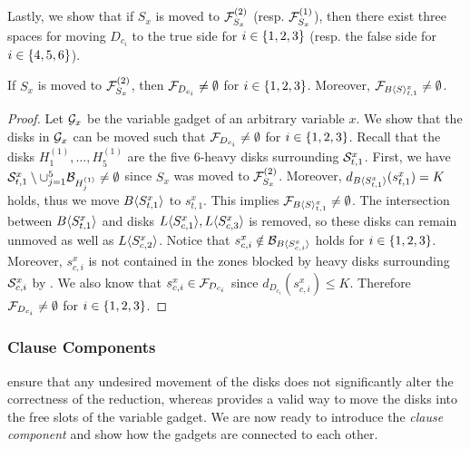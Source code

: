 \begin{toappendix}
\begin{toappendix}
Lastly, we show that if $S_x$ is moved to $\F_{S_x}^{(2)}$ (resp. $\F_{S_x}^{(1)}$), then there exist three spaces for moving $D_{c_i}$ to the true side for $i\in \set{1,2,3}$ (resp. the false side for $i\in \set{4,5,6}$).
\begin{mlemmarep}\label{lem:feasible_areas_available}
    If $S_x$ is moved to $\F_{S_x}^{(2)}$, then $\F_{D_{c_i}} \neq \emptyset$ for $i \in \set{1,2,3}$.
    Moreover, $\F_{\bdisk{S}^x_{t,1}} \neq \emptyset$.
\end{mlemmarep}

\begin{proof}
    Let $\G_{x}$ be the variable gadget of an arbitrary variable $x$.
    We show that the disks in $\G_{x}$ can be moved such that $\F_{D_{c_i}} \neq \emptyset$ for $i \in \set{1,2,3}$.
    Recall that the disks $H_1^{(1)},\ldots,H_5^{(1)}$ are the five $6$-heavy disks surrounding $\S^x_{t,1}$.
    First, we have $\S^x_{t,1} \setminus \cup_{j=1}^5 \B_{H_j^{(1)}} \neq \emptyset$ since $S_x$ was moved to $\F_{S_x}^{(2)}$.
    Moreover, $d_{\bdisk{S^x_{t,1}}}(s^x_{t,1}) = K$ holds, thus we move $\bdisk{S^x_{t,1}}$ to $s^x_{t,1}$.
    This implies $\F_{\bdisk{S}^x_{t,1}} \neq \emptyset$.
    The intersection between $\bdisk{S^x_{t,1}}$ and disks $\ldisk{S^x_{c,1}},\ldisk{S^x_{c,3}}$ is removed, so these disks can remain unmoved as well as $\ldisk{S^x_{c,2}}$.
    Notice that $s^x_{c,i}\notin \B_{\bdisk{S^x_{c,i}}}$ holds for $i\in \set{1,2,3}$.
    Moreover, $s^x_{c,i}$ is not contained in the zones blocked by heavy disks surrounding $\S^x_{c,i}$ by .
    We also know that $s^x_{c,i} \in \F_{D_{c_i}}$ since $d_{D_{c_i}}(s^x_{c,i}) \le K$.
    Therefore $\F_{D_{c_i}} \neq \emptyset$ for $i \in \set{1,2,3}$.
\end{proof}

\subsubsection{Clause Components}
 ensure that any undesired movement of the disks does not significantly alter the correctness of the reduction, whereas  provides a valid way to move the disks into the free slots of the variable gadget.
We are now ready to introduce the \emph{clause component} and show how the gadgets are connected to each other.


\end{toappendix}
\end{toappendix}
